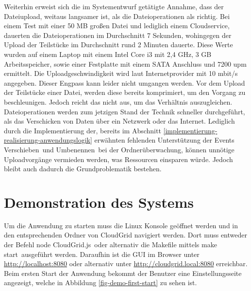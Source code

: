 Weiterhin erweist sich die im Systementwurf getätigte Annahme, dass der Dateiupload, weitaus langsamer ist, als die Dateioperationen als richtig.
Bei einem Test mit einer 50 \ac{MB} großen Datei und lediglich einem Cloudservice, dauerten die Dateioperationen im Durchschnitt 7 Sekunden, wohingegen der Upload der Teilstücke im Durchschnitt rund 2 Minuten dauerte.
Diese Werte wurden auf einem Laptop mit einem Intel Core i3 mit 2,4 \ac{GHz}, 3 \ac{GB} Arbeitsspeicher, sowie einer Festplatte mit einem \ac{SATA} Anschluss und 7200 \ac{upm} ermittelt.
Die Uploadgeschwindigkeit wird laut Internetprovider mit 10 mbit/s angegeben.
Dieser Engpass kann leider nicht umgangen werden.
Vor dem Upload der Teilstücke einer Datei, werden diese bereits komprimiert, um den Vorgang zu beschleunigen.
Jedoch reicht das nicht aus, um das Verhältnis auszugleichen.
Dateioperationen werden zum jetzigen Stand der Technik schneller durchgeführt, als das Verschicken von Daten über ein Netzwerk oder das Internet.
Lediglich durch die Implementierung der, bereits im Abschnitt \ref{implementierung-realisierung-anwendungslogik} erwähnten fehlenden Unterstützung der Events \frqq Verschieben\flqq\ und \frqq Umbenennen\flqq\ bei der Ordnerüberwachung, können unnötige Uploadvorgänge vermieden werden, was Ressourcen einsparen würde.
Jedoch bleibt auch dadurch die Grundproblematik bestehen.

\section{Demonstration des Systems}

Um die Anwendung zu starten muss die Linux Konsole geöffnet werden und in den entsprechenden Ordner von CloudGrid navigiert werden.
Dort muss entweder der Befehl \frqq node CloudGrid.js\flqq\ oder alternativ die Makefile mittels \frqq make start\flqq\ ausgeführt werden.
Daraufhin ist die \ac{GUI} im Browser unter \url{http://localhost:8080} oder alternativ unter \url{http://cloudgrid.local:8080} erreichbar.
Beim ersten Start der Anwendung bekommt der Benutzer eine Einstellungsseite angezeigt, welche in Abbildung \ref{fig-demo-first-start} zu sehen ist.

